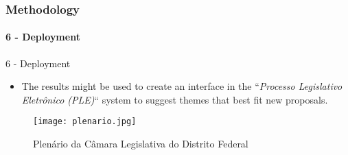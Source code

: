 



\begin{frame}
	\frametitle{Methodology}
	\framesubtitle{6 - Deployment}	
	
	\begin{block}{6 - Deployment} 
		\begin{itemize}
			\item The results might be used to create an interface in the ``\textit{Processo Legislativo Eletrônico (PLE)}`` system to suggest themes that best fit new proposals.
		\end{itemize}
	\end{block}

	\begin{figure}
		\texttt{[image: plenario.jpg]}
		\caption{Plenário da Câmara Legislativa do Distrito Federal}
	\end{figure}


\end{frame}
